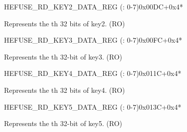 \begin{register}{H}{EFUSE\_RD\_KEY2\_DATA\_REG (: 0-7)}{0x00DC+0x4*}\label{regdesc:EFUSERDKEY2DATANREG}
%
\regnewline%
\begin{regdesc}\begin{reglist}
\label{fielddesc:EFUSEKEY2DATAN}\item [EFUSE\_KEY2\_DATA\regindex{n}] Represents the th 32 bits of key2. (RO)
\end{reglist}\end{regdesc}
\end{register}


\begin{register}{H}{EFUSE\_RD\_KEY3\_DATA\_REG (: 0-7)}{0x00FC+0x4*}\label{regdesc:EFUSERDKEY3DATANREG}
%
\regnewline%
\begin{regdesc}\begin{reglist}
\label{fielddesc:EFUSEKEY3DATAN}\item [EFUSE\_KEY3\_DATA\regindex{n}] Represents the th 32-bit of key3. (RO)
\end{reglist}\end{regdesc}
\end{register}


\begin{register}{H}{EFUSE\_RD\_KEY4\_DATA\_REG (: 0-7)}{0x011C+0x4*}\label{regdesc:EFUSERDKEY4DATANREG}
%
\regnewline%
\begin{regdesc}\begin{reglist}
\label{fielddesc:EFUSEKEY4DATAN}\item [EFUSE\_KEY4\_DATA\regindex{n}] Represents the th 32 bits of key4. (RO)
\end{reglist}\end{regdesc}
\end{register}


\begin{register}{H}{EFUSE\_RD\_KEY5\_DATA\_REG (: 0-7)}{0x013C+0x4*}\label{regdesc:EFUSERDKEY5DATANREG}
%
\regnewline%
\begin{regdesc}\begin{reglist}
\label{fielddesc:EFUSEKEY5DATAN}\item [EFUSE\_KEY5\_DATA\regindex{n}] Represents the th 32-bit of key5. (RO)
\end{reglist}\end{regdesc}
\end{register}


